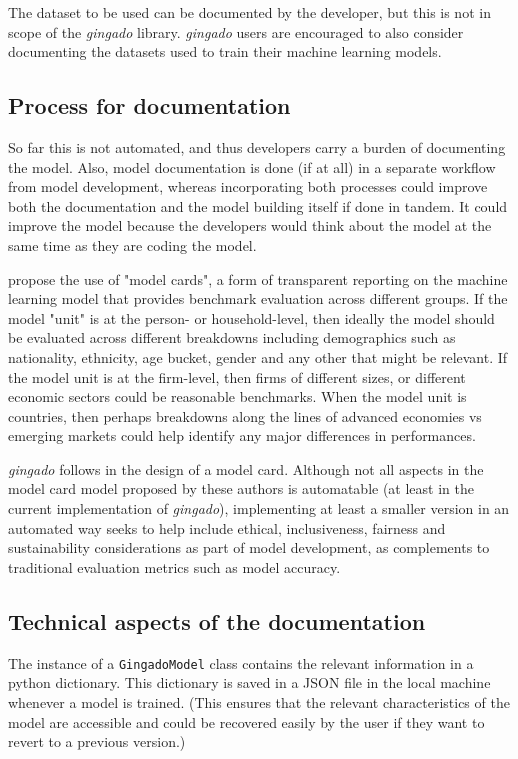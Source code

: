 \documentclass{article}
\begin{document}
The dataset to be used can be documented by the developer, but this is not in scope of the \textit{gingado} library. \textit{gingado} users are encouraged to also consider documenting the datasets used to train their machine learning models.

\subsection{Process for documentation}

So far this is not automated, and thus developers carry a burden of documenting the model. Also, model documentation is done (if at all) in a separate workflow from model development, whereas incorporating both processes could improve both the documentation and the model building itself if done in tandem. It could improve the model because the developers would think about the model at the same time as they are coding the model.

\cite{ModelCards} propose the use of "model cards", a form of transparent reporting on the machine learning model that provides benchmark evaluation across different groups. If the model "unit" is at the person- or household-level, then ideally the model should be evaluated across different breakdowns including demographics such as nationality, ethnicity, age bucket, gender and any other that might be relevant. If the model unit is at the firm-level, then firms of different sizes, or different economic sectors could be reasonable benchmarks. When the model unit is countries, then perhaps breakdowns along the lines of advanced economies vs emerging markets could help identify any major differences in performances.


\textit{gingado} follows \cite{ModelCards} in the design of a model card. Although not all aspects in the model card model proposed by these authors is automatable (at least in the current implementation of \textit{gingado}), implementing at least a smaller version in an automated way seeks to help include ethical, inclusiveness, fairness and sustainability considerations as part of model development, as complements to traditional evaluation metrics such as model accuracy.

\subsection{Technical aspects of the documentation}

The instance of a \texttt{GingadoModel} class contains the relevant information in a python dictionary. This dictionary is saved in a JSON file in the local machine whenever a model is trained. (This ensures that the relevant characteristics of the model are accessible and could be recovered easily by the user if they want to revert to a previous version.)
\end{document}
